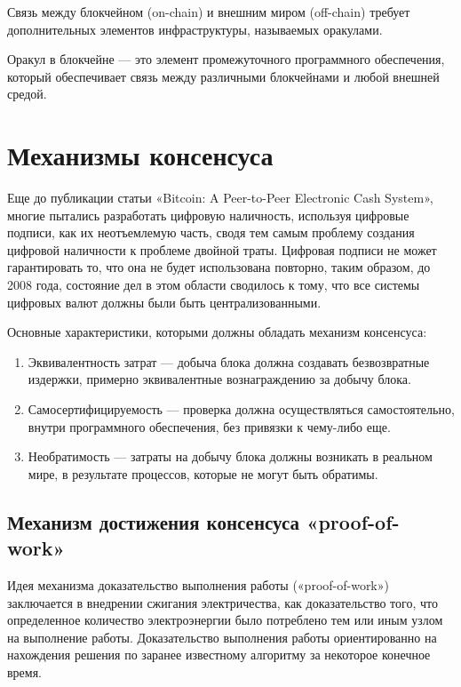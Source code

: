 Связь между блокчейном (on-chain) и внешним миром (off-chain) требует дополнительных элементов инфраструктуры, называемых оракулами.

Оракул в блокчейне — это элемент промежуточного программного обеспечения, который обеспечивает связь между различными блокчейнами и любой внешней средой.

\section{Механизмы консенсуса}

Еще до публикации статьи «Bitcoin: A Peer-to-Peer Electronic Cash System», многие пытались разработать цифровую наличность, используя цифровые подписи, как их неотъемлемую часть, сводя тем самым проблему создания цифровой наличности к проблеме двойной траты. Цифровая подписи не может гарантировать то, что она не будет использована повторно, таким образом, до 2008 года, состояние дел в этом области сводилось к тому, что все системы цифровых валют должны были быть централизованными.

Основные характеристики, которыми должны обладать механизм консенсуса:

\begin{enumerate} 
  \item Эквивалентность затрат — добыча блока должна создавать безвозвратные издержки, примерно эквивалентные вознаграждению за добычу блока.
  
  \item Самосертифицируемость — проверка должна осуществляться самостоятельно, внутри программного обеспечения, без привязки к чему-либо еще.
  
  \item Необратимость — затраты на добычу блока должны возникать в реальном мире, в результате процессов, которые не могут быть обратимы.
\end{enumerate}

\subsection{Механизм достижения консенсуса «proof-of-work»}

Идея механизма доказательство выполнения работы («proof-of-work») заключается в внедрении сжигания электричества, как доказательство того, что определенное количество электроэнергии было потреблено тем или иным узлом на выполнение работы. Доказательство выполнения работы ориентированно на нахождения решения по заранее известному алгоритму за некоторое конечное время.

